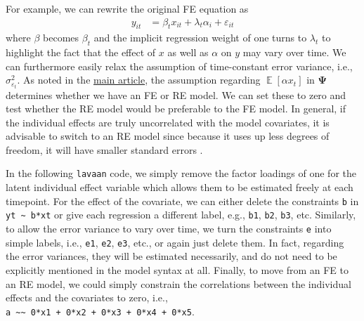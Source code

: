 \documentclass[]{interact}
\theoremstyle{plain}%
\theoremstyle{definition}
\theoremstyle{remark}
\begin{document}
For example, we can rewrite the original FE equation as \begin{align}
y_{it} & = \beta_{t}x_{it} + \lambda_{t}\alpha_{i} + \varepsilon_{it}
\end{align} where \(\beta\) becomes \(\beta_{t}\) and the implicit
regression weight of one turns to \(\lambda_{t}\) to highlight the fact
that the effect of \(x\) as well as \(\alpha\) on \(y\) may vary over
time. We can furthermore easily relax the assumption of time-constant
error variance, i.e., \(\sigma^{2}_{\varepsilon_{t}}\). As noted in the
\href{https://github.com/henrik-andersen/FE-SEM/blob/master/article.pdf}{main
article}, the assumption regarding
\(\mathop{\mathrm{\mathbb{E}}}[\alpha x_{t}]\) in \(\bm{\Psi}\)
determines whether we have an FE or RE model. We can set these to zero
and test whether the RE model would be preferable to the FE model. In
general, if the individual effects are truly uncorrelated with the model
covariates, it is advisable to switch to an RE model since because it
uses up less degrees of freedom, it will have smaller standard errors
\citep{Bollen2010}.

In the following \texttt{lavaan} code, we simply remove the factor
loadings of one for the latent individual effect variable which allows
them to be estimated freely at each timepoint. For the effect of the
covariate, we can either delete the constraints \texttt{b} in
\texttt{yt\ \textasciitilde{}\ b*xt} or give each regression a different
label, e.g., \texttt{b1}, \texttt{b2}, \texttt{b3}, etc. Similarly, to
allow the error variance to vary over time, we turn the constraints
\texttt{e} into simple labels, i.e., \texttt{e1}, \texttt{e2},
\texttt{e3}, etc., or again just delete them. In fact, regarding the
error variances, they will be estimated necessarily, and do not need to
be explicitly mentioned in the model syntax at all. Finally, to move
from an FE to an RE model, we could simply constrain the correlations
between the individual effects and the covariates to zero, i.e.,
\texttt{a\ \textasciitilde{}\textasciitilde{}\ 0*x1\ +\ 0*x2\ +\ 0*x3\ +\ 0*x4\ +\ 0*x5}.

\singlespacing
\end{document}
